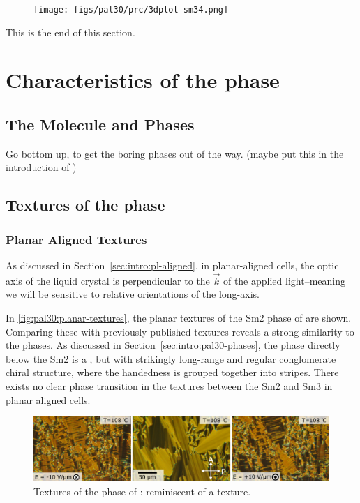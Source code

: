 \documentclass[aagreenthesis]{subfiles}
\begin{document}
\begin{figure}[h!]
    \centering
    \texttt{[image: figs/pal30/prc/3dplot-sm34.png]}
    \caption{\label{fig:pal30:sm34:prc2}}
\end{figure}

This is the end of this section.


\section{Characteristics of the \smcpalpha{} phase}



\subsection{The \nfour{} Molecule and Phases}
 Go bottom up, to get the boring phases out
of the way. (maybe put this in the introduction of \nfour{})
\subsection{Textures of the \smcpalpha{} phase}
\subsubsection{Planar Aligned Textures}
As discussed in Section~\ref{sec:intro:pl-aligned}, in planar-aligned cells, the
optic axis of the liquid crystal is perpendicular to the $\vec{k}$ of the
applied light--meaning we will be sensitive to relative orientations of the
long-axis.

In \autoref{fig:pal30:planar-textures}, the planar textures of the Sm2 phase of \nfour{} are shown.
Comparing these with previously published textures reveals a strong similarity
to the \smcapa{}
phases\cite{link_spontaneous_1997,ReddyInfluencefluorinesubstituent2003}. As
discussed in Section~\ref{sec:intro:pal30-phases}, the \nfour{} phase directly below the
Sm2 is a \smcapa{}, but with strikingly long-range and regular conglomerate
chiral structure, where the handedness is grouped together into stripes. There
exists no clear phase transition in the textures between the Sm2 and Sm3 in
planar aligned cells.

\begin{figure}[h!]
    \centering
    \includegraphics[width=\textwidth]{figs/pal30/textureSM2/sm2Textures100.png}
    \caption{\label{fig:pal30:planar-textures} Textures of the \smcpalpha{}
    phase of \nfour{}: reminiscent of a \smcapa{} texture.  }
\end{figure}
\end{document}
